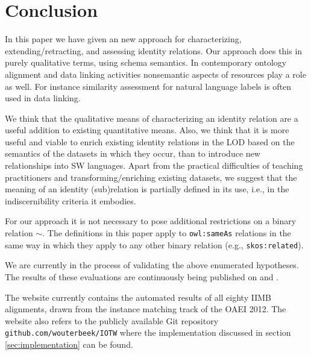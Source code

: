 \section{Conclusion}
\label{sec:conclusion}

In this paper we have given an new approach for characterizing,
  extending/retracting, and assessing identity relations.
Our approach does this in purely qualitative terms, using schema semantics.
In contemporary ontology alignment and data linking activities nonsemantic
  aspects of resources play a role as well.
For instance similarity assessment for natural language labels is often
  used in data linking.

We think that the qualitative means of characterizing an identity relation
  are a useful addition to existing quantitative means.
Also, we think that it is more useful and viable to enrich existing
  identity relations in the LOD based on the semantics of the datasets
  in which they occur, than to introduce new relationships into SW languages.
Apart from the practical difficulties of teaching practitioners
  and transforming/enriching existing datasets, we suggest that the
  meaning of an identity (sub)relation is partially defined in its use,
  i.e., in the indiscernibility criteria it embodies.

For our approach it is not necessary to pose additional restrictions
  on a binary relation $\sim$.
The definitions in this paper apply to \verb|owl:sameAs| relations
  in the same way in which they apply to any other binary relation
  (e.g., \verb|skos:related|).

We are currently in the process of validating the above enumerated hypotheses.
The results of these evaluations are continuously being published on
   and
.


The website currently contains the automated results of all eighty IIMB
  alignments, drawn from the instance matching track of the
  OAEI 2012.
The website also refers to the publicly available Git repository
  \verb|github.com/wouterbeek/IOTW| where the implementation
  discussed in section \ref{sec:implementation} can be found.
